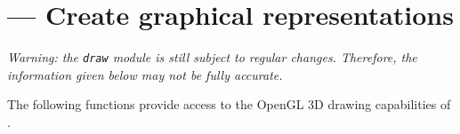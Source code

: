 
\section{ --- Create graphical representations}
\label{sec:drawing}

\emph{Warning: the \texttt{draw} module is still subject to regular changes. Therefore, the information given below may not be fully accurate.
}


The following functions provide access to the OpenGL 3D drawing capabilities of \pyformex.


